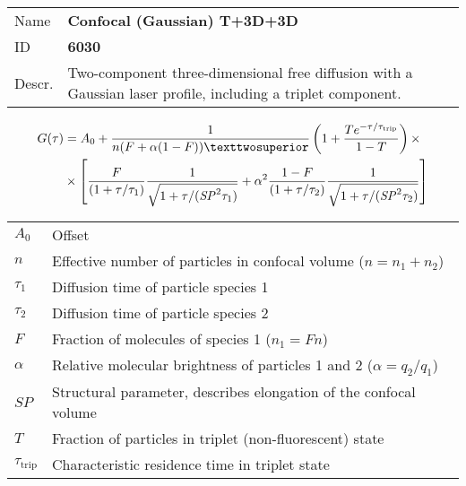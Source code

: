 \noindent \begin{tabular}{lp{}}
Name & \textbf{Confocal (Gaussian) T+3D+3D} \\ 
ID & \textbf{6030} \\ 
Descr. &  Two-component three-dimensional free diffusion with a Gaussian laser profile, including a triplet component\cite{Elson1974, Aragon1976, Palmer1987}. \\ 
\end{tabular}
\begin{align}
G(\tau) &= A_0 + \frac{1}{n (F + \alpha (1-F))²}  \left(1 + \frac{T e^{-\tau/\tau_\mathrm{trip}}}{1-T}  \right)  \times \\
\notag &\times  \left[ \frac{F}{(1+\tau/\tau_1)}  \frac{1}{\sqrt{1+\tau/(\mathit{SP}^2 \tau_1)}} + \alpha^2 \frac{1-F}{ (1+\tau/\tau_2) }  \frac{1}{\sqrt{1+\tau/(\mathit{SP}^2 \tau_2)}} \right]
\end{align} 
\begin{center}
\begin{tabular}{ll}
$A_0$ & Offset \\ 
$n$ & Effective number of particles in confocal volume ($n = n_1+n_2$) \\ 
$\tau_1$ &  Diffusion time of particle species 1 \\ 
$\tau_2$ &  Diffusion time of particle species 2 \\ 
$F$ & Fraction of molecules of species 1 ($n_1 = F n$) \\
$\alpha$ & Relative molecular brightness of particles 1 and 2 ($ \alpha = q_2/q_1$) \\
$\mathit{SP}$ & Structural parameter, describes elongation of the confocal volume \\
$T$ &  Fraction of particles in triplet (non-fluorescent) state\\ 
$\tau_\mathrm{trip}$ &  Characteristic residence time in triplet state \\ 
\end{tabular}
\end{center}
\vspace{2em}



